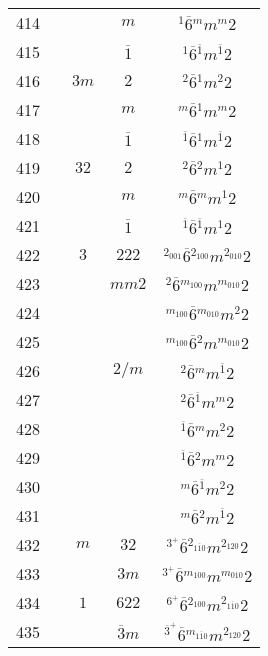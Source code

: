\begin{longtable}{ccccc}
  414 &  &  & $m$ & ${}^{1} \overline{6} {}^{m} m {}^{m} 2 $\\
  415 &  &  & $\overline{1}$ & ${}^{1} \overline{6} {}^{\overline{1}} m {}^{\overline{1}} 2 $\\
  416 &  & $3m$ & $2$ & ${}^{2} \overline{6} {}^{1} m {}^{2} 2 $\\
  417 &  &  & $m$ & ${}^{m} \overline{6} {}^{1} m {}^{m} 2 $\\
  418 &  &  & $\overline{1}$ & ${}^{\overline{1}} \overline{6} {}^{1} m {}^{\overline{1}} 2 $\\
  419 &  & $32$ & $2$ & ${}^{2} \overline{6} {}^{2} m {}^{1} 2 $\\
  420 &  &  & $m$ & ${}^{m} \overline{6} {}^{m} m {}^{1} 2 $\\
  421 &  &  & $\overline{1}$ & ${}^{\overline{1}} \overline{6} {}^{\overline{1}} m {}^{1} 2 $\\
  422 &  & $3$ & $222$ & ${}^{2_{001}} \overline{6} {}^{2_{100}} m {}^{2_{010}} 2 $\\
  423 &  &  & $mm2$ & ${}^{2} \overline{6} {}^{m_{100}} m {}^{m_{010}} 2 $\\
  424 &  &  &  & ${}^{m_{100}} \overline{6} {}^{m_{010}} m {}^{2} 2 $\\
  425 &  &  &  & ${}^{m_{100}} \overline{6} {}^{2} m {}^{m_{010}} 2 $\\
  426 &  &  & $2/m$ & ${}^{2} \overline{6} {}^{m} m {}^{\overline{1}} 2 $\\
  427 &  &  &  & ${}^{2} \overline{6} {}^{\overline{1}} m {}^{m} 2 $\\
  428 &  &  &  & ${}^{\overline{1}} \overline{6} {}^{m} m {}^{2} 2 $\\
  429 &  &  &  & ${}^{\overline{1}} \overline{6} {}^{2} m {}^{m} 2 $\\
  430 &  &  &  & ${}^{m} \overline{6} {}^{\overline{1}} m {}^{2} 2 $\\
  431 &  &  &  & ${}^{m} \overline{6} {}^{2} m {}^{\overline{1}} 2 $\\
  432 &  & $m$ & $32$ & ${}^{3^{+}} \overline{6} {}^{2_{1\overline{1}0}} m {}^{2_{120}} 2 $\\
  433 &  &  & $3m$ & ${}^{3^{+}} \overline{6} {}^{m_{100}} m {}^{m_{010}} 2 $\\
  434 &  & $1$ & $622$ & ${}^{6^{+}} \overline{6} {}^{2_{100}} m {}^{2_{1\overline{1}0}} 2 $\\
  435 &  &  & $\overline{3}m$ & ${}^{\overline{3}^{+}} \overline{6} {}^{m_{1\overline{1}0}} m {}^{2_{120}} 2 $\\

\end{longtable}
